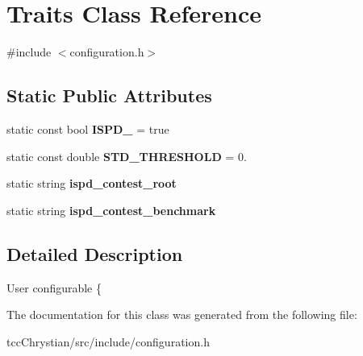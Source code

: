 \hypertarget{classTraits}{\section{Traits Class Reference}
\label{classTraits}
}


{\ttfamily \#include $<$configuration.\-h$>$}

\subsection*{Static Public Attributes}
\begin{DoxyCompactItemize}
\item 
\hypertarget{classTraits_a6be4a9876454c3e6e139e7d213a74884}{static const bool {\bfseries I\-S\-P\-D\-\_} = true}\label{classTraits_a6be4a9876454c3e6e139e7d213a74884}

\item 
\hypertarget{classTraits_ab7f403f849da178fd4c1995084f3709b}{static const double {\bfseries S\-T\-D\-\_\-\-T\-H\-R\-E\-S\-H\-O\-L\-D} = 0.}\label{classTraits_ab7f403f849da178fd4c1995084f3709b}

\item 
\hypertarget{classTraits_a418b8b76f68ab0a74e58119f32330547}{static string {\bfseries ispd\-\_\-contest\-\_\-root}}\label{classTraits_a418b8b76f68ab0a74e58119f32330547}

\item 
\hypertarget{classTraits_af167fe41eea5cdd9e190a0807f39b3f4}{static string {\bfseries ispd\-\_\-contest\-\_\-benchmark}}\label{classTraits_af167fe41eea5cdd9e190a0807f39b3f4}

\end{DoxyCompactItemize}


\subsection{Detailed Description}
User configurable \{ 

The documentation for this class was generated from the following file\-:\begin{DoxyCompactItemize}
\item 
tcc\-Chrystian/src/include/configuration.\-h\end{DoxyCompactItemize}
